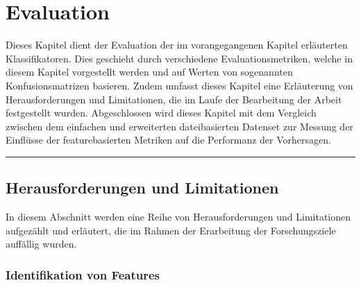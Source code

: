 
\chapter{Evaluation}
\label{evaluation}

Dieses Kapitel dient der Evaluation der im vorangegangenen Kapitel erläuterten Klassifikatoren. Dies geschieht durch verschiedene Evaluationsmetriken, welche in diesem Kapitel vorgestellt werden und auf Werten von sogenannten Konfusionsmatrizen basieren. Zudem umfasst dieses Kapitel eine Erläuterung von Herausforderungen und Limitationen, die im Laufe der Bearbeitung der Arbeit festgestellt wurden. Abgeschlossen wird dieses Kapitel mit dem Vergleich zwischen dem \glqq einfachen\grqq{} und erweiterten dateibasierten Datenset zur Messung der Einflüsse der featurebasierten Metriken auf die Performanz der Vorhersagen. 
\\
\hrule

\section{Herausforderungen und Limitationen}

In diesem Abschnitt werden eine Reihe von Herausforderungen und Limitationen aufgezählt und erläutert, die im Rahmen der Erarbeitung der Forschungsziele auffällig wurden.

\subsection*{Identifikation von Features}

